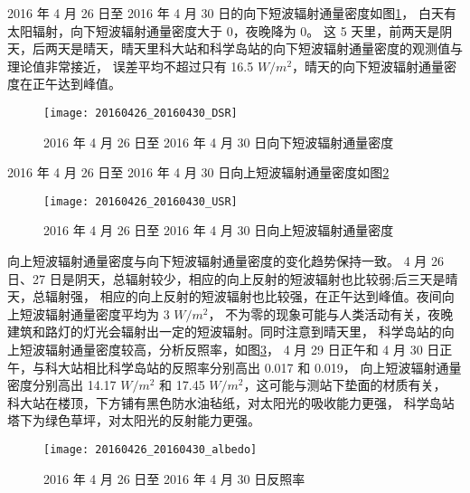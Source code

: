 2016 年 4 月 26 日至 2016 年 4 月 30 日的向下短波辐射通量密度如图\ref{fig:20160426_20160430_DSR}，
白天有太阳辐射，向下短波辐射通量密度大于 0，夜晚降为 0。
这 5 天里，前两天是阴天，后两天是晴天，晴天里科大站和科学岛站的向下短波辐射通量密度的观测值与理论值非常接近，
误差平均不超过只有 16.5 $W/m^{2}$，晴天的向下短波辐射通量密度在正午达到峰值。
\begin{figure}[H]
\centering
\texttt{[image: 20160426\_20160430\_DSR]}
\caption{2016 年 4 月 26 日至 2016 年 4 月 30 日向下短波辐射通量密度}\label{fig:20160426_20160430_DSR}
\end{figure}
2016 年 4 月 26 日至 2016 年 4 月 30 日向上短波辐射通量密度如图\ref{fig:20160426_20160430_USR}
\begin{figure}[H]
\centering
\texttt{[image: 20160426\_20160430\_USR]}
\caption{2016 年 4 月 26 日至 2016 年 4 月 30 日向上短波辐射通量密度}\label{fig:20160426_20160430_USR}
\end{figure}
向上短波辐射通量密度与向下短波辐射通量密度的变化趋势保持一致。
4 月 26 日、27 日是阴天，总辐射较少，相应的向上反射的短波辐射也比较弱;后三天是晴天，总辐射强，
相应的向上反射的短波辐射也比较强，在正午达到峰值。夜间向上短波辐射通量密度平均为 3 $W/m^{2}$，
不为零的现象可能与人类活动有关，夜晚建筑和路灯的灯光会辐射出一定的短波辐射。同时注意到晴天里，
科学岛站的向上短波辐射通量密度较高，分析反照率，如图\ref{fig:20160426_20160430_albedo}，
4 月 29 日正午和 4 月 30 日正午，与科大站相比科学岛站的反照率分别高出 0.017 和 0.019，
向上短波辐射通量密度分别高出 14.17 $W/m^{2}$ 和 17.45 $W/m^{2}$，这可能与测站下垫面的材质有关，
科大站在楼顶，下方铺有黑色防水油毡纸，对太阳光的吸收能力更强，
科学岛站塔下为绿色草坪，对太阳光的反射能力更强。
\begin{figure}[H]
\centering
\texttt{[image: 20160426\_20160430\_albedo]}
\caption{2016 年 4 月 26 日至 2016 年 4 月 30 日反照率}\label{fig:20160426_20160430_albedo}
\end{figure}

